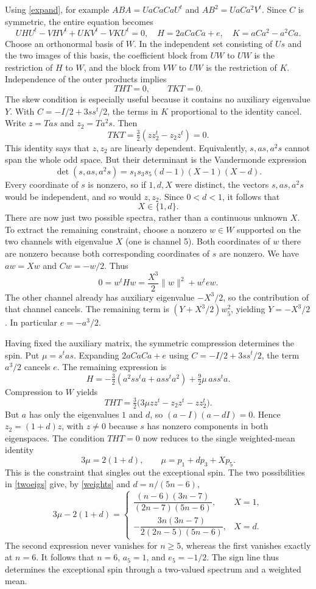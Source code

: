 \documentclass[11pt]{article}
\begin{document}
Using \eqref{expand}, for example $ABA=UaCaCaU^t$ and $AB^2=UaCa^2V^t$. Since $C$ is symmetric, the entire equation becomes
\begin{equation}\label{oddexpand}
 UHU^t-VHV^t+UKV^t-VKU^t=0,
 \quad H=2aCaCa+e,\quad K=aCa^2-a^2Ca.
\end{equation}
Choose an orthonormal basis of $W$. In the independent set consisting of $Us$ and the two images of this basis, the coefficient block from $UW$ to $UW$ is the restriction of $H$ to $W$, and the block from $VW$ to $UW$ is the restriction of $K$. Independence of the outer products implies
\[
 THT=0,\qquad TKT=0.
\]
The skew condition is especially useful because it contains no auxiliary eigenvalue $Y$. With $C=-I/2+3ss^t/2$, the terms in $K$ proportional to the identity cancel. Write $z=Tas$ and $z_2=Ta^2s$. Then
\[
 TKT=\tfrac32(zz_2^t-z_2z^t)=0.
\]
This identity says that $z,z_2$ are linearly dependent. Equivalently, $s,as,a^2s$ cannot span the whole odd space. But their determinant is the Vandermonde expression
\[
 \det(s,as,a^2s)=s_1s_3s_5(d-1)(X-1)(X-d).
\]
Every coordinate of $s$ is nonzero, so if $1,d,X$ were distinct, the vectors $s,as,a^2s$ would be independent, and so would $z,z_2$. Since $0<d<1$, it follows that
\begin{equation}\label{twoeigs}
 X\in\{1,d\}.
\end{equation}
There are now just two possible spectra, rather than a continuous unknown $X$. To extract the remaining constraint, choose a nonzero $w\in W$ supported on the two channels with eigenvalue $X$ (one is channel 5). Both coordinates of $w$ there are nonzero because both corresponding coordinates of $s$ are nonzero. We have $aw=Xw$ and $Cw=-w/2$. Thus
\[
 0=w^tHw=\frac{X^3}{2}\|w\|^2+w^tew.
\]
The other channel already has auxiliary eigenvalue $-X^3/2$, so the contribution of that channel cancels. The remaining term is $(Y+X^3/2)w_5^2$, yielding $Y=-X^3/2$. In particular $e=-a^3/2$.

Having fixed the auxiliary matrix, the symmetric compression determines the spin. Put $\mu=s^tas$. Expanding $2aCaCa+e$ using $C=-I/2+3ss^t/2$, the term $a^3/2$ cancels $e$. The remaining expression is
\[
 H=-\tfrac32(a^2ss^ta+ass^ta^2)+\tfrac92\mu\,ass^ta.
\]
Compression to $W$ yields
\[
 THT=\tfrac32\big(3\mu zz^t-z_2z^t-zz_2^t\big).
\]
But $a$ has only the eigenvalues $1$ and $d$, so $(a-I)(a-dI)=0$. Hence $z_2=(1+d)z$, with $z\ne0$ because $s$ has nonzero components in both eigenspaces. The condition $THT=0$ now reduces to the single weighted-mean identity
\[
 3\mu=2(1+d),\qquad \mu=p_1+d p_3+X p_5.
\]
This is the constraint that singles out the exceptional spin. The two possibilities in \eqref{twoeigs} give, by \eqref{weights} and $d=n/(5n-6)$,
\[
 3\mu-2(1+d)=\begin{cases}
 \dfrac{(n-6)(3n-7)}{(2n-7)(5n-6)},&X=1,\\[4pt]
 -\dfrac{3n(3n-7)}{2(2n-5)(5n-6)},&X=d.
 \end{cases}
\]
The second expression never vanishes for $n\ge5$, whereas the first vanishes exactly at $n=6$. It follows that $n=6$, $a_5=1$, and $e_5=-1/2$. The sign line thus determines the exceptional spin through a two-valued spectrum and a weighted mean.
\end{document}

